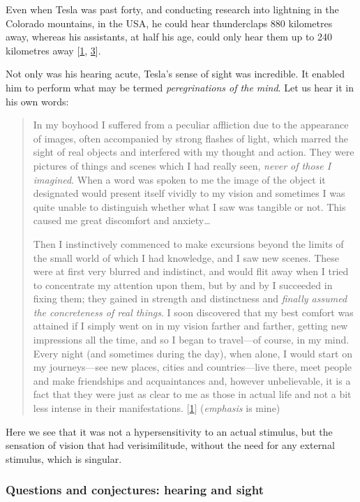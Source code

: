 \documentclass[
  a4paper,
]{article}
\begin{document}
Even when Tesla was past forty, and conducting research into lightning
in the Colorado mountains, in the USA, he could hear thunderclaps 880
kilometres away, whereas his assistants, at half his age, could only
hear them up to 240 kilometres away
{[}\protect\hyperlink{ref-john83}{1},
\protect\hyperlink{ref-cheney81}{3}{]}.

Not only was his hearing acute, Tesla's sense of sight was incredible.
It enabled him to perform what may be termed \emph{peregrinations of the
mind}. Let us hear it in his own words:

\begin{quote}
In my boyhood I suffered from a peculiar affliction due to the
appearance of images, often accompanied by strong flashes of light,
which marred the sight of real objects and interfered with my thought
and action. They were pictures of things and scenes which I had really
seen, \emph{never of those I imagined}. When a word was spoken to me the
image of the object it designated would present itself vividly to my
vision and sometimes I was quite unable to distinguish whether what I
saw was tangible or not. This caused me great discomfort and
anxiety\ldots{}

Then I instinctively commenced to make excursions beyond the limits of
the small world of which I had knowledge, and I saw new scenes. These
were at first very blurred and indistinct, and would flit away when I
tried to concentrate my attention upon them, but by and by I succeeded
in fixing them; they gained in strength and distinctness and
\emph{finally assumed the concreteness of real things}. I soon
discovered that my best comfort was attained if I simply went on in my
vision farther and farther, getting new impressions all the time, and so
I began to travel---of course, in my mind. Every night (and sometimes
during the day), when alone, I would start on my journeys---see new
places, cities and countries---live there, meet people and make
friendships and acquaintances and, however unbelievable, it is a fact
that they were just as clear to me as those in actual life and not a bit
less intense in their manifestations.
{[}\protect\hyperlink{ref-john83}{1}{]} (\emph{emphasis} is mine)
\end{quote}

Here we see that it was not a hypersensitivity to an actual stimulus,
but the sensation of vision that had verisimilitude, without the need
for any external stimulus, which is singular.

\hypertarget{questions-and-conjectures-hearing-and-sight}{%
\subsubsection{Questions and conjectures: hearing and
sight}\label{questions-and-conjectures-hearing-and-sight}}
\end{document}
